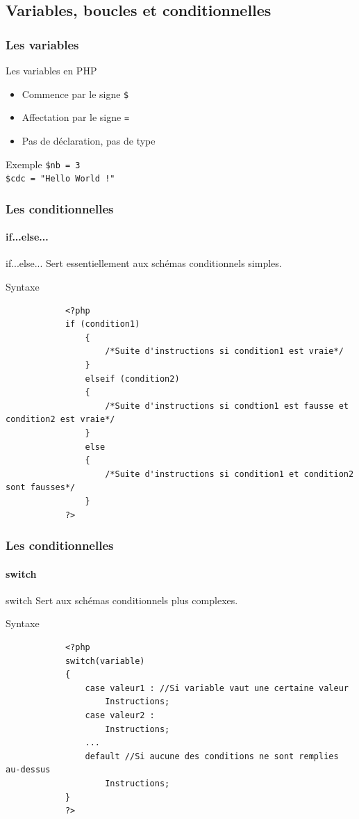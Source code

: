 \documentclass[handout]{beamer}
\begin{document}
\subsection{Variables, boucles et conditionnelles}
\begin{frame}
	\frametitle{Les variables}
	\begin{block}{Les variables en PHP}
		\begin{itemize}
			\item Commence par le signe \texttt{\$}
			\item Affectation par le signe \texttt{=}
			\item Pas de déclaration, pas de type
		\end{itemize}
	\end{block}

	\begin{exampleblock}{Exemple}
		\texttt{\$nb = 3}\\
		\texttt{\$cdc = "Hello World !"}
	\end{exampleblock}
\end{frame}
 
\begin{frame}[fragile]
	\frametitle{Les conditionnelles}
	\framesubtitle{if...else...}
	\begin{block}{if...else...}
	Sert essentiellement aux schémas conditionnels simples.
\end{block}

	\begin{alertblock}{Syntaxe}
		\begin{verbatim}
			<?php
			if (condition1)
				{
					/*Suite d'instructions si condition1 est vraie*/
				}
				elseif (condition2)
				{
					/*Suite d'instructions si condtion1 est fausse et condition2 est vraie*/
				}
				else
				{
					/*Suite d'instructions si condition1 et condition2 sont fausses*/
				}
			?>
		\end{verbatim}
	\end{alertblock}
\end{frame}


\begin{frame}[fragile]
	\frametitle{Les conditionnelles}
	\framesubtitle{switch}
	\begin{block}{switch}
	Sert aux schémas conditionnels plus complexes.
	\end{block}

	\begin{alertblock}{Syntaxe}
		\begin{verbatim}
			<?php
			switch(variable)
			{
				case valeur1 : //Si variable vaut une certaine valeur
					Instructions;
				case valeur2 :
					Instructions;
				...
				default //Si aucune des conditions ne sont remplies au-dessus
					Instructions;
			}
			?>
		\end{verbatim}
	\end{alertblock}
\end{frame}
\end{document}

